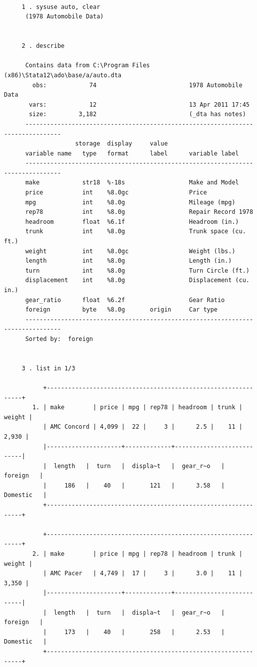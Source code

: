 \documentclass{article}
\begin{document}
\begin{verbatim}
      
      

     1 . sysuse auto, clear      
      (1978 Automobile Data)
      

     2 . describe
      
      Contains data from C:\Program Files (x86)\Stata12\ado\base/a/auto.dta
        obs:            74                          1978 Automobile Data
       vars:            12                          13 Apr 2011 17:45
       size:         3,182                          (_dta has notes)
      --------------------------------------------------------------------------------
                    storage  display     value
      variable name   type   format      label      variable label
      --------------------------------------------------------------------------------
      make            str18  %-18s                  Make and Model
      price           int    %8.0gc                 Price
      mpg             int    %8.0g                  Mileage (mpg)
      rep78           int    %8.0g                  Repair Record 1978
      headroom        float  %6.1f                  Headroom (in.)
      trunk           int    %8.0g                  Trunk space (cu. ft.)
      weight          int    %8.0gc                 Weight (lbs.)
      length          int    %8.0g                  Length (in.)
      turn            int    %8.0g                  Turn Circle (ft.)
      displacement    int    %8.0g                  Displacement (cu. in.)
      gear_ratio      float  %6.2f                  Gear Ratio
      foreign         byte   %8.0g       origin     Car type
      --------------------------------------------------------------------------------
      Sorted by:  foreign
      

     3 . list in 1/3
      
           +---------------------------------------------------------------+
        1. | make        | price | mpg | rep78 | headroom | trunk | weight |
           | AMC Concord | 4,099 |  22 |     3 |      2.5 |    11 |  2,930 |
           |---------------------+-------------+---------------------------|
           |  length   |  turn   |  displa~t   |  gear_r~o   |   foreign   |
           |     186   |    40   |       121   |      3.58   |  Domestic   |
           +---------------------------------------------------------------+
      
           +---------------------------------------------------------------+
        2. | make        | price | mpg | rep78 | headroom | trunk | weight |
           | AMC Pacer   | 4,749 |  17 |     3 |      3.0 |    11 |  3,350 |
           |---------------------+-------------+---------------------------|
           |  length   |  turn   |  displa~t   |  gear_r~o   |   foreign   |
           |     173   |    40   |       258   |      2.53   |  Domestic   |
           +---------------------------------------------------------------+
      

\end{verbatim}
\end{document}
